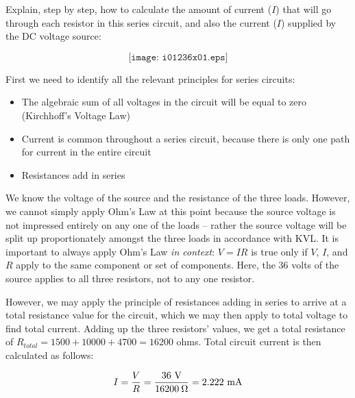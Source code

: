 

Explain, step by step, how to calculate the amount of current ($I$) that will go through each resistor in this series circuit, and also the current ($I$) supplied by the DC voltage source:

$$\texttt{[image: i01236x01.eps]}$$







First we need to identify all the relevant principles for series circuits:

\begin{itemize}
\item{} The algebraic sum of all voltages in the circuit will be equal to zero (Kirchhoff's Voltage Law)
\item{} Current is common throughout a series circuit, because there is only one path for current in the entire circuit
\item{} Resistances add in series
\end{itemize}

We know the voltage of the source and the resistance of the three loads.  However, we cannot simply apply Ohm's Law at this point because the source voltage is not impressed entirely on any one of the loads -- rather the source voltage will be split up proportionately amongst the three loads in accordance with KVL.  It is important to always apply Ohm's Law {\it in context}: $V = IR$ is true only if $V$, $I$, and $R$ apply to the same component or set of components.  Here, the 36 volts of the source applies to all three resistors, not to any one resistor.

\vskip 10pt

However, we may apply the principle of resistances adding in series to arrive at a total resistance value for the circuit, which we may then apply to total voltage to find total current.  Adding up the three resistors' values, we get a total resistance of $R_{total} = 1500 + 10000 + 4700 = 16200$ ohms.  Total circuit current is then calculated as follows:

$$I = {V \over R} = {36 \hbox{ V} \over 16200 \> \Omega} = 2.222 \hbox{ mA}$$

